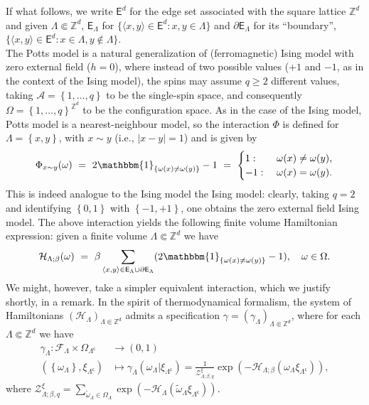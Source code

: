 \documentclass[12pt]{article}
\newcommand{\A}{\mathcal{A}}
\newcommand{\E}{\mathsf{E}}
\newcommand{\F}{\mathcal{F}}
\renewcommand{\H}{\mathcal{H}}
\newcommand{\Z}{\mathbb{Z}}
\newcommand{\ZZ}{\mathcal{Z}}
\newcommand{\set}[1]{\left\{#1\right\}}
\newcommand{\oklepaj}[1]{\left(#1\right)}
\newcommand{\ra}{\rightarrow}
\newcommand{\1}{\mathbbm{1}}
\renewcommand{\sp}[1]{\langle #1\rangle}
\renewcommand{\c}{\mathsf{c}}
\newcommand{\5}{\vspace{0.5cm}}
\renewcommand{\tilde}{\widetilde}
\theoremstyle{definition}
\begin{document}
If what follows, we write $\E^d$ for the edge set associated with the square lattice $\Z^d$ and given $\Lambda\Subset\Z^d$, $\E_\Lambda$ for $\{\sp{x,y}\in\E^d:x,y\in\Lambda\}$ and $\partial\E_\Lambda$ for its ``boundary'', $\{\sp{x,y}\in\E^d:x\in\Lambda,y\notin\Lambda\}$. \\

The Potts model is a natural generalization of (ferromagnetic) Ising model with zero external field ($h=0$), where instead of two possible values ($+1$ and $-1$, as in the context of the Ising model), the spins may assume $q\geq 2$ different values, taking $\A=\set{1,\ldots,q}$ to be the single-spin space, and consequently $\Omega=\set{1,\ldots,q}^{\Z^d}$ to be the configuration space. As in the case of the Ising model, Potts model is a nearest-neighbour model, so the interaction $\Phi$ is defined for $\Lambda=\set{x,y}$, with $x\sim y$ (i.e., $|x-y|=1$) and is given by
$$\Phi_{x\sim y}(\omega) ~=~ 2\1_{\set{\omega(x)\neq \omega(y)}}-1 ~=~ \begin{cases}
1: ~&\omega(x)\neq\omega(y), \\
-1: ~&\omega(x)=\omega(y).
\end{cases}$$
This is indeed analogue to the Ising model the Ising model: clearly, taking $q=2$ and identifying $\set{0,1}$ with $\set{-1,+1}$, one obtains the zero external field Ising model. The above interaction yields the following finite volume Hamiltonian expression: given a finite volume $\Lambda\Subset\Z^d$ we have
$$\H_{\Lambda;\beta}(\omega) ~=~ \beta\sum_{\sp{x,y}\in\E_\Lambda\cup\partial\E_\Lambda}(2\1_{\set{\omega(x)\neq\omega(y)}}-1), \quad \omega\in\Omega.$$
We might, however, take a simpler equivalent interaction, which we justify shortly, in a remark. In the spirit of thermodynamical formalism, the system of Hamiltonians $(\H_\Lambda)_{\Lambda\Subset\Z^d}$ admits a specification $\gamma=(\gamma_\Lambda)_{\Lambda\Subset\Z^d}$, where for each $\Lambda\Subset\Z^d$ we have
\begin{align*}
\gamma_\Lambda:\F_\Lambda\times\Omega_{\Lambda^\c}&\ra (0,1) \\
(\set{\omega_{\Lambda}},\xi_{\Lambda^\c})&\mapsto\gamma_{\Lambda}(\omega_{\Lambda}|\xi_{\Lambda^\c})=\frac{1}{\ZZ_{\Lambda;\beta,q}^\xi}\exp\!\oklepaj{-\H_{\Lambda;\beta}(\omega_\Lambda\xi_{\Lambda^\c})},
\end{align*}
where $\ZZ_{\Lambda;\beta,q}^\xi=\sum_{\tilde{\omega}_\Lambda\in\Omega_\Lambda}\exp\!\oklepaj{-\H_\Lambda(\tilde{\omega}_{\Lambda}\xi_{\Lambda^\c})}$.
\end{document}
